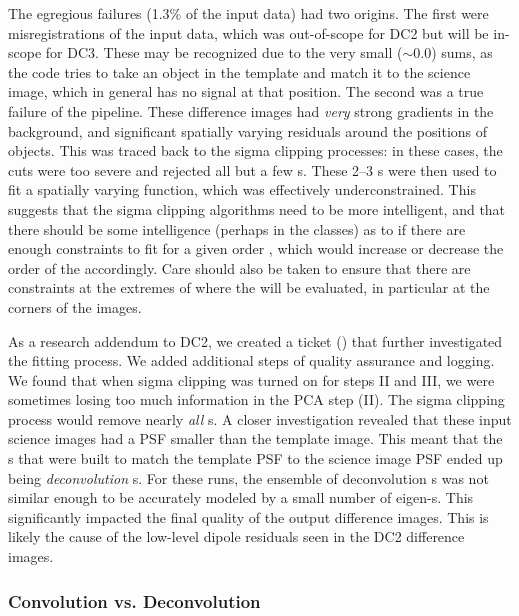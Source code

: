 The egregious failures (1.3\% of the input data) had two origins.  The
first were misregistrations of the input data, which was
out-of-scope for DC2 but will be in-scope for DC3.  These may be
recognized due to the very small ($\sim 0.0$)  sums, as
the code tries to take an object in the template and match it to the
science image, which in general has no signal at that position.  The
second was a true failure of the pipeline.  These difference images had
\textit{very} strong gradients in the background, and significant
spatially varying residuals around the positions of objects.  This was
traced back to the sigma clipping processes: in these cases, the cuts
were too severe and rejected all but a few s.  These 2--3
s were then used to fit a spatially varying function,
which was effectively underconstrained.  This suggests that the sigma
clipping algorithms need to be more intelligent, and that there should
be some intelligence (perhaps in the  classes) as to if
there are enough constraints to fit for a given order ,
which would increase or decrease the order of the 
accordingly.  Care should also be taken to ensure that there are
constraints at the extremes of where the  will be
evaluated, in particular at the corners of the images.

As a research addendum to DC2, we created a ticket () that further
investigated the  fitting process.  We added additional
steps of quality assurance and logging.  We found that when sigma
clipping was turned on for  steps II and III, we were
sometimes losing too much information in the PCA step (II).  The sigma clipping
process would remove nearly \textit{all} s.  A closer
investigation revealed that these input science images had a PSF smaller
than the template image.  This meant that the s that were
built to match the template PSF to the science image PSF ended up
being \textit{deconvolution} s.  For these runs, the
ensemble of deconvolution s was not similar enough
to be accurately modeled by a small number of eigen-s.
This significantly impacted the final quality of the output difference
images.  This is likely the cause of the low-level dipole residuals
seen in the DC2 difference images.

\subsubsection{Convolution vs. Deconvolution}

